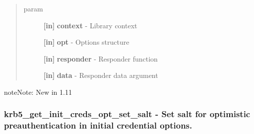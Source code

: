 \documentclass[letterpaper,10pt,english]{sphinxmanual}
\begin{document}
\begin{fulllineitems}
\label{appdev/refs/api/krb5_get_init_creds_opt_set_responder:krb5_get_init_creds_opt_set_responder}
\end{fulllineitems}

\begin{quote}\begin{description}
\item[{param}] \leavevmode
\textbf{{[}in{]}} \textbf{context} - Library context

\textbf{{[}in{]}} \textbf{opt} - Options structure

\textbf{{[}in{]}} \textbf{responder} - Responder function

\textbf{{[}in{]}} \textbf{data} - Responder data argument

\end{description}\end{quote}

\begin{notice}{note}{Note:}
New in 1.11
\end{notice}


\subsubsection{krb5\_get\_init\_creds\_opt\_set\_salt -  Set salt for optimistic preauthentication in initial credential options.}
\label{appdev/refs/api/krb5_get_init_creds_opt_set_salt:krb5-get-init-creds-opt-set-salt-set-salt-for-optimistic-preauthentication-in-initial-credential-options}\label{appdev/refs/api/krb5_get_init_creds_opt_set_salt::doc}

\begin{fulllineitems}
\label{appdev/refs/api/krb5_get_init_creds_opt_set_salt:krb5_get_init_creds_opt_set_salt}
\end{fulllineitems}
\end{document}
